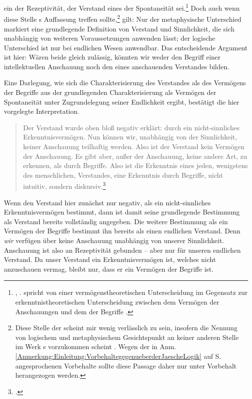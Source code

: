 ein  der Rezeptivität, der Verstand eines der Spontaneität
sei.\footnote{\cite[Vgl.][A 45]{Kant:ImmanuelKantsLogik1977},
\cite[][IX: 36.8--12]{Kant:GesammelteWerke1900ff.}.
 spricht von einer
vermögenstheoretischen Unterscheidung im Gegensatz zur erkenntnistheoretischen
Unterscheidung zwischen dem Vermögen der Anschauungen und dem der Begriffe
\parencite[vgl.][84]{Heidemann:AnschauungundBegriff2002}.} Doch auch wenn diese
Stelle s Auffassung treffen sollte,\footnote{Diese Stelle
der {\jaeschelogik} scheint mir wenig verlässlich zu sein, insofern die Nennung
von logischem und metaphysischem Gesichtspunkt an keiner anderen Stelle im Werk
s vorzukommen scheint
\parencite[vgl.][83]{Heidemann:AnschauungundBegriff2002}. Wegen der in Anm.
\ref{Anmerkung:Einleitung:VorbehaltegegenueberderJaescheLogik} auf
S.~\pageref{Anmerkung:Einleitung:VorbehaltegegenueberderJaescheLogik}
angesprochenen Vorbehalte sollte diese Passage daher nur unter Vorbehalt
herangezogen werden.} gilt: Nur der metaphysische Unterschied markiert eine
grundlegende Definition von Verstand und Sinnlichkeit, die sich unabhängig von
weiteren Voraussetzungen anwenden lässt; der logische Unterschied ist nur bei
endlichen Wesen anwendbar. Das entscheidende Argument ist hier:
Wären beide gleich zulässig, könnten wir weder den Begriff einer intellektuellen
Anschauung noch den eines anschauenden Verstandes bilden.

Eine Darlegung, wie sich die Charakterisierung des Verstandes als des
Vermögens der Begriffe aus der grundlegenden Charakterisierung als Vermögen der
Spontaneität unter Zugrundelegung seiner Endlichkeit ergibt, bestätigt die hier
vorgelegte Interpretation.
\begin{quote}
Der Verstand wurde oben bloß negativ erklärt: durch ein nicht-sinnliches
Erkenntnisvermögen. Nun können wir, unabhängig von der Sinnlichkeit, keiner
Anschauung teilhaftig werden. Also ist der Verstand kein Vermögen der
Anschauung. Es gibt aber, außer der Anschauung, keine andere Art, zu erkennen,
als durch Begriffe. Also ist die Erkenntnis eines jeden, wenigstens des
menschlichen, Verstandes, eine Erkenntnis durch Begriffe, nicht intuitiv,
sondern diskursiv.\footnote{\cite[][B
92\,f.,]{Kant:KritikderreinenVernunft2003} \cite[][III:
85.10--16]{Kant:GesammelteWerke1900ff.}.}
\end{quote}
Wenn  den Verstand hier zunächst nur negativ, als ein
nicht-sinnliches Erkenntnisvermögen bestimmt, dann ist damit seine grundlegende
Bestimmung als Verstand bereits vollständig angegeben. Die weitere Bestimmung
als ein Vermögen der Begriffe bestimmt ihn bereits als einen endlichen Verstand.
Denn \emph{wir} verfügen über keine Anschauung unabhängig von unserer
Sinnlichkeit. Anschauung ist also an Rezeptivität gebunden -- aber nur für
unseren endlichen Verstand. Da unser Verstand ein Erkenntnisvermögen ist,
welches nicht anzuschauen vermag, bleibt nur, dass er ein Vermögen der Begriffe
ist.

